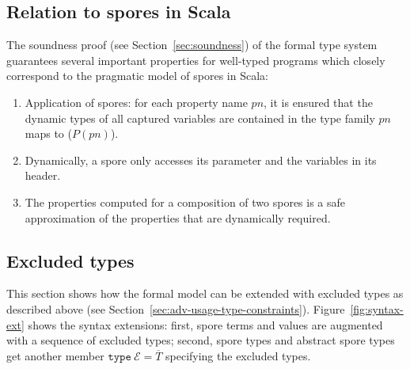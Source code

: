 \documentclass{llncs}
\newcommand{\seq}[1]{\overline{#1}}
\begin{document}
\subsection{Relation to spores in Scala}

The soundness proof (see Section~\ref{sec:soundness}) of the formal type system guarantees several important properties for well-typed programs which closely correspond to the pragmatic model of spores in Scala:

\begin{enumerate}

\item Application of spores: for each property name $pn$, it is ensured that the dynamic types of all captured variables are contained in the type family $pn$ maps to ($P(pn)$).

\item Dynamically, a spore only accesses its parameter and the variables in its header.

\item The properties computed for a composition of two spores is a safe approximation of the properties that are dynamically required.

\end{enumerate}


\subsection{Excluded types}

This section shows how the formal model can be extended with excluded types as described above (see Section~\ref{sec:adv-usage-type-constraints}). Figure~\ref{fig:syntax-ext} shows the syntax extensions: first, spore terms and values are augmented with a sequence of excluded types; second, spore types and abstract spore types get another member $\texttt{type}~\mathcal{E} = \seq{T}$ specifying the excluded types.
\end{document}
